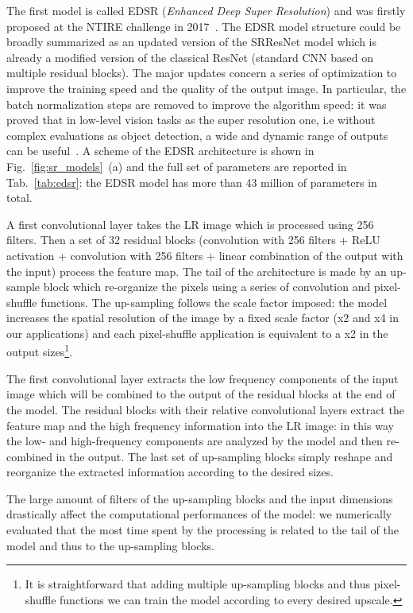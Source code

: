 \documentclass{standalone}
\begin{document}
The first model is called EDSR (\emph{Enhanced Deep Super Resolution}) and was firstly proposed at the NTIRE challenge in 2017~\cite{Agustsson_2017_CVPR_Workshops}.
The EDSR model structure could be broadly summarized as an updated version of the SRResNet model which is already a modified version of the classical ResNet (standard CNN based on multiple residual blocks).
The major updates concern a series of optimization to improve the training speed and the quality of the output image.
In particular, the batch normalization steps are removed to improve the algorithm speed: it was proved that in low-level vision tasks as the super resolution one, i.e without complex evaluations as object detection, a wide and dynamic range of outputs can be useful~\cite{edsr}.
A scheme of the EDSR architecture is shown in Fig.~\ref{fig:sr_models}~(a) and the full set of parameters are reported in Tab.~\ref{tab:edsr}: the EDSR model has more than 43 million of parameters in total.

A first convolutional layer takes the LR image which is processed using 256 filters.
Then a set of 32 residual blocks (convolution with 256 filters + ReLU activation + convolution with 256 filters + linear combination of the output with the input) process the feature map.
The tail of the architecture is made by an up-sample block which re-organize the pixels using a series of convolution and pixel-shuffle functions.
The up-sampling follows the scale factor imposed: the model increases the spatial resolution of the image by a fixed scale factor (x2 and x4 in our applications) and each pixel-shuffle application is equivalent to a x2 in the output sizes\footnote{
  It is straightforward that adding multiple up-sampling blocks and thus pixel-shuffle functions we can train the model according to every desired upscale.
}.

The first convolutional layer extracts the low frequency components of the input image which will be combined to the output of the residual blocks at the end of the model.
The residual blocks with their relative convolutional layers extract the feature map and the high frequency information into the LR image: in this way the low- and high-frequency components are  analyzed by the model and then re-combined in the output.
The last set of up-sampling blocks simply reshape and reorganize the extracted information according to the desired sizes.

The large amount of filters of the up-sampling blocks and the input dimensions drastically affect the computational performances of the model: we numerically evaluated that the most time spent by the processing is related to the tail of the model and thus to the up-sampling blocks.
\end{document}
